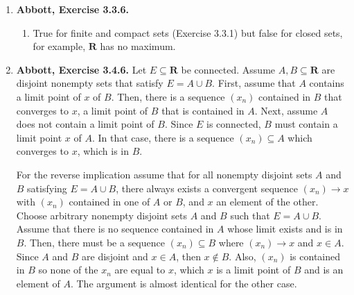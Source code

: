 \documentclass{article}
\makeatletter
\DeclarePairedDelimiter\abs{\lvert}{\rvert}
\let\oldabs\abs
\def\abs{\@ifstar{\oldabs}{\oldabs*}}
\newcommand{\N}{\mathbf{N}}
\newcommand{\R}{\mathbf{R}}
\newcommand{\exc}[2][Abbott]{\item \textbf{#1, Exercise #2.}}
\makeatother
\begin{document}
\begin{enumerate}
\begin{enumerate}
        \item False. $[0,1] \cup [1,2] \cup [2,3] \dots$ is not bounded, therefore not compact.
        
        \item False. Let $A = (1,2)$ and $K = [0, 3]$. Then $A \cap K = (1, 2)$, which is not closed, therefore not compact.
        
        \item False. For each $n \in \N$ define 
        \begin{equation*}
            F_n = \bigcup_{k=n}^\infty [2k, 2k+1].
        \end{equation*} To see that every $F_n$ is closed, we use Theorem 3.2.8. Let $(a_n)$ be a Cauchy sequence contained in $F_n$. Then, there is some $N \in \N$ such that $\abs{a_p-a_q} < 1/2$ for all $p, q \geq N$, thus every term of the sequence is eventually in the same interval $[2k, 2k+1]$ for some $k \geq n$. Since $[2k, 2k+1]$ is closed, the limit of $(a_n)$ is in $[2k, 2k+1]$, therefore it is also in $F_n$, so $F_n$ is closed. Now, assume the intersection $\bigcap_{n=1}^\infty F_n \neq \emptyset$. Then, there is some $x \in \R$ such that $x \in F_n$ for all $n \in N$, in particular $x \in F_1$. Then, there must be some $k \geq 1$ such that $x \in [2k, 2k+1]$. But then, $x \notin F_{k+1}$, which is a contradiction. Hence, we can conclude that $\bigcap_{n=1}^\infty F_n = \emptyset$.
    \end{enumerate}
    
    \exc{3.3.6}
    \begin{enumerate}
        \item True for finite and compact sets (Exercise 3.3.1) but false for closed sets, for example, $\R$ has no maximum.
    \end{enumerate}
    
    \exc{3.4.6}
    Let $E \subseteq \R$ be connected. Assume $A,B \subseteq \R$ are disjoint nonempty sets that satisfy $E = A \cup B$. First, assume that $A$ contains a limit point of $x$ of $B$. Then, there is a sequence $(x_n)$ contained in $B$ that converges to $x$, a limit point of $B$ that is contained in $A$. Next, assume $A$ does not contain a limit point of $B$. Since $E$ is connected, $B$ must contain a limit point $x$ of $A$. In that case, there is a sequence $(x_n) \subseteq A$ which converges to $x$, which is in $B$.
    
    For the reverse implication assume that for all nonempty disjoint sets $A$ and $B$ satisfying $E = A \cup B$, there always exists a convergent sequence $(x_n) \to x$ with $(x_n)$ contained in one of $A$ or $B$, and $x$ an element of the other. Choose arbitrary nonempty disjoint sets $A$ and $B$ such that $E = A \cup B$. Assume that there is no sequence contained in $A$ whose limit exists and is in $B$. Then, there must be a sequence $(x_n) \subseteq B$ where $(x_n) \to x$ and $x \in A$. Since $A$ and $B$ are disjoint and $x \in A$, then $x \notin B$. Also, $(x_n)$ is contained in $B$ so none of the $x_n$ are equal to $x$, which $x$ is a limit point of $B$ and is an element of $A$. The argument is almost identical for the other case.
    

\end{enumerate}
\end{document}
